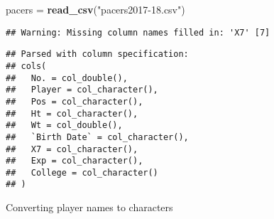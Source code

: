 \documentclass[]{article}
\newenvironment{Shaded}{\begin{snugshade}}{\end{snugshade}}
\newcommand{\KeywordTok}[1]{\textcolor[rgb]{0.13,0.29,0.53}{\textbf{#1}}}
\newcommand{\DecValTok}[1]{\textcolor[rgb]{0.00,0.00,0.81}{#1}}
\newcommand{\CharTok}[1]{\textcolor[rgb]{0.31,0.60,0.02}{#1}}
\newcommand{\StringTok}[1]{\textcolor[rgb]{0.31,0.60,0.02}{#1}}
\newcommand{\CommentTok}[1]{\textcolor[rgb]{0.56,0.35,0.01}{\textit{#1}}}
\newcommand{\OperatorTok}[1]{\textcolor[rgb]{0.81,0.36,0.00}{\textbf{#1}}}
\newcommand{\NormalTok}[1]{#1}
\begin{document}
\begin{Shaded}
\begin{Highlighting}[]
\NormalTok{pacers =}\StringTok{ }\KeywordTok{read_csv}\NormalTok{(}\StringTok{"pacers2017-18.csv"}\NormalTok{)}
\end{Highlighting}
\end{Shaded}

\begin{verbatim}
## Warning: Missing column names filled in: 'X7' [7]
\end{verbatim}

\begin{verbatim}
## Parsed with column specification:
## cols(
##   No. = col_double(),
##   Player = col_character(),
##   Pos = col_character(),
##   Ht = col_character(),
##   Wt = col_double(),
##   `Birth Date` = col_character(),
##   X7 = col_character(),
##   Exp = col_character(),
##   College = col_character()
## )
\end{verbatim}

Converting player names to characters

\begin{Shaded}
\end{Shaded}

\begin{Shaded}
\end{Shaded}
\end{document}
